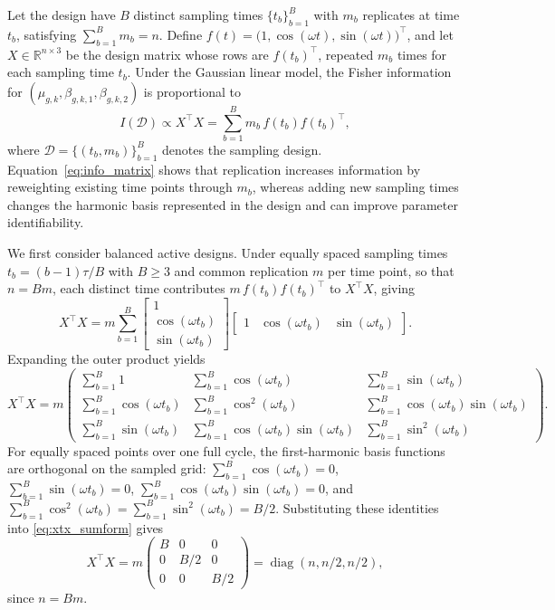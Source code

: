 \documentclass{article}
\begin{document}
Let the design have $B$ distinct sampling times $\{t_b\}_{b=1}^B$ with $m_b$
replicates at time $t_b$, satisfying $\sum_{b=1}^B m_b=n$. Define
$f(t)=\bigl(1,\cos(\omega t),\sin(\omega t)\bigr)^\top$, and let
$X\in\mathbb{R}^{n\times 3}$ be the design matrix whose rows are $f(t_b)^\top$,
repeated $m_b$ times for each sampling time $t_b$. Under the Gaussian linear
model, the Fisher information for $(\mu_{g,k},\beta_{g,k,1},\beta_{g,k,2})$ is
proportional to
\begin{equation}
I(\mathcal{D}) \propto X^\top X
=
\sum_{b=1}^B m_b\, f(t_b)f(t_b)^\top,
\label{eq:info_matrix}
\end{equation}
where $\mathcal{D}=\{(t_b,m_b)\}_{b=1}^B$ denotes the sampling design.
Equation~\eqref{eq:info_matrix} shows that replication increases information by
reweighting existing time points through $m_b$, whereas adding new sampling
times changes the harmonic basis represented in the design and can improve
parameter identifiability.

We first consider balanced active designs. Under equally spaced sampling times
$t_b=(b-1)\tau/B$ with $B\geq 3$ and common replication $m$ per time point, so
that $n=Bm$, each distinct time contributes
$m\,f(t_b)f(t_b)^\top$ to $X^\top X$, giving
\begin{equation}
X^\top X
=
m\sum_{b=1}^B
\begin{bmatrix}
1 \\
\cos(\omega t_b) \\
\sin(\omega t_b)
\end{bmatrix}
\begin{bmatrix}
1 & \cos(\omega t_b) & \sin(\omega t_b)
\end{bmatrix}.
\label{eq:xtx_expand}
\end{equation}
Expanding the outer product yields
\begin{equation}
X^\top X
=
m
\begin{pmatrix}
\sum_{b=1}^B 1 &
\sum_{b=1}^B \cos(\omega t_b) &
\sum_{b=1}^B \sin(\omega t_b) \\[6pt]
\sum_{b=1}^B \cos(\omega t_b) &
\sum_{b=1}^B \cos^2(\omega t_b) &
\sum_{b=1}^B \cos(\omega t_b)\sin(\omega t_b) \\[6pt]
\sum_{b=1}^B \sin(\omega t_b) &
\sum_{b=1}^B \cos(\omega t_b)\sin(\omega t_b) &
\sum_{b=1}^B \sin^2(\omega t_b)
\end{pmatrix}.
\label{eq:xtx_sumform}
\end{equation}
For equally spaced points over one full cycle, the first-harmonic basis
functions are orthogonal on the sampled grid:
$\sum_{b=1}^B \cos(\omega t_b)=0$,
$\sum_{b=1}^B \sin(\omega t_b)=0$,
$\sum_{b=1}^B \cos(\omega t_b)\sin(\omega t_b)=0$,
and
$\sum_{b=1}^B \cos^2(\omega t_b)=\sum_{b=1}^B \sin^2(\omega t_b)=B/2$.
Substituting these identities into \eqref{eq:xtx_sumform} gives
\begin{equation}
X^\top X
=
m
\begin{pmatrix}
B & 0 & 0 \\
0 & B/2 & 0 \\
0 & 0 & B/2
\end{pmatrix}
=
\operatorname{diag}(n,n/2,n/2),
\label{eq:xtx_balanced}
\end{equation}
since $n=Bm$.
\end{document}
